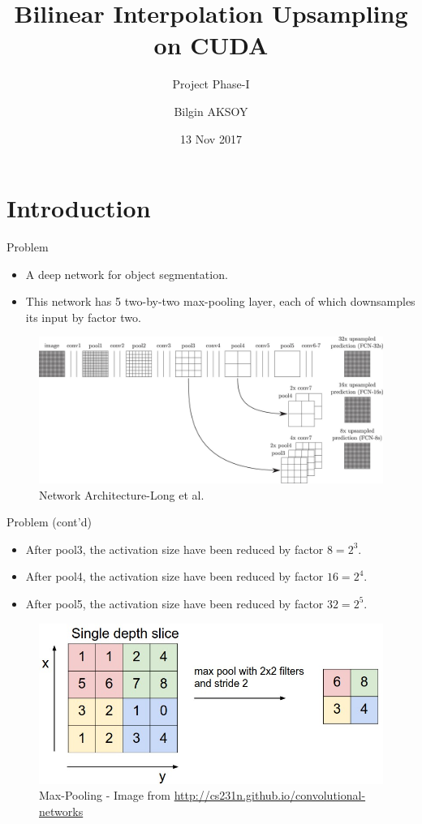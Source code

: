 \documentclass{beamer}
\title[Applied Parallel Programming]{Bilinear Interpolation Upsampling on CUDA}
\subtitle{Project Phase-I}
\author{Bilgin AKSOY}
\institute{\bf Informatics Enstitute}
\date{13 Nov 2017}
\begin{document}
	\begin{frame}
	  \titlepage
	\end{frame}

\section{Introduction}

	\begin{frame}{Problem}
		
		\begin{itemize}
		  \item A deep network for object segmentation.  
		  \item \justifying This network has 5 two-by-two max-pooling layer, each of which downsamples its input by factor two. 
		\end{itemize}
		\begin{figure}
		  \includegraphics[scale=0.15]{./Figures/DAGnet.jpg}
		  \caption{\label{fig:DAGnet}Network Architecture-Long et al.\cite{long2015fully}}
		\end{figure}	
	\end{frame}
	\begin{frame}{Problem (cont'd)}
		\begin{itemize}
				\item After pool3, the activation size have been reduced by factor $8= 2^3 $.
				\item After pool4, the activation size have been reduced by factor $16= 2^4 $.
				\item After pool5, the activation size have been reduced by factor $32= 2^5 $.
		\end{itemize}
		\begin{figure}
					\includegraphics[scale=0.3]{./Figures/maxpool.jpeg}
					\caption{Max-Pooling - Image from \url{http://cs231n.github.io/convolutional-networks}}
		\end{figure}
	\end{frame}
\end{document}
